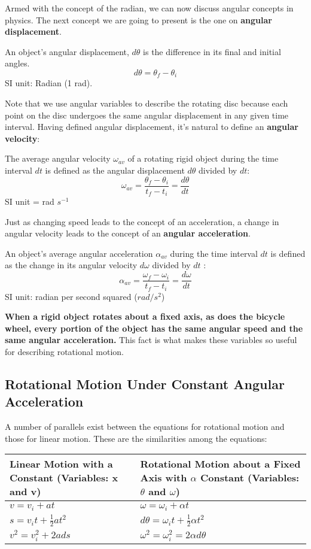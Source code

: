 Armed with the concept of the radian, we can now discuss angular concepts in physics. The next concept we are going to present is the one on \textbf{angular displacement}.
\begin{defi}
An object's angular displacement, $d \theta$ is the difference in its final and initial angles.
$$d \theta = \theta_f - \theta_i$$
SI unit: Radian (1 rad).
\end{defi}
Note that we use angular variables to describe the rotating disc because each point on the disc undergoes the same angular displacement in any given time interval. Having defined angular displacement, it's natural to define an \textbf{angular velocity}:
\begin{defi}
The average angular velocity $\omega_{av}$ of a rotating rigid object during the time interval $d t$ is defined as the angular displacement $d \theta$ divided by $d t$:
$$\omega_{av} = \frac{\theta_f-\theta_i}{t_f-t_i} = \frac{d \theta}{d t}$$
SI unit = rad $s^{-1}$
\end{defi}

Just as changing speed leads to the concept of an acceleration, a change in angular velocity leads to the concept of an \textbf{angular acceleration}.

\begin{defi}
An object's average angular acceleration $\alpha_{av}$ during the time interval $d t$ is defined
as the change in its angular velocity $d \omega$ divided by $d t$ :
$$\alpha_{av} = \frac{\omega_f - \omega_i}{t_f-t_i} = \frac{d \omega}{d t}$$
SI unit: radian per second squared ($rad/s^2$)
\end{defi}

\textbf{When a rigid object rotates about a fixed axis, as does the bicycle wheel, every portion of the object has the same angular speed and the same angular acceleration.} This fact is what makes these variables so useful for describing rotational motion.

\subsection{Rotational Motion Under Constant Angular Acceleration}
A number of parallels exist between the equations for rotational motion and those for linear motion. These are the similarities among the equations:

\begin{tabular}{p{} p{}} \toprule 
Linear Motion with a Constant (Variables: x and v) & Rotational Motion about a Fixed Axis with $\alpha$ Constant (Variables: $\theta$ and $\omega$)\\ \midrule
$v=v_i + at$ & $\omega = \omega_i + \alpha t$\\
$s = v_it + \frac{1}{2}at^2$ & $d \theta = \omega_it + \frac{1}{2}\alpha t^2$ \\
$v^2 = v_i^2 + 2ad s$ & $\omega^2 = \omega_i^2 = 2 \alpha d \theta$ \\ \bottomrule
\end{tabular}

